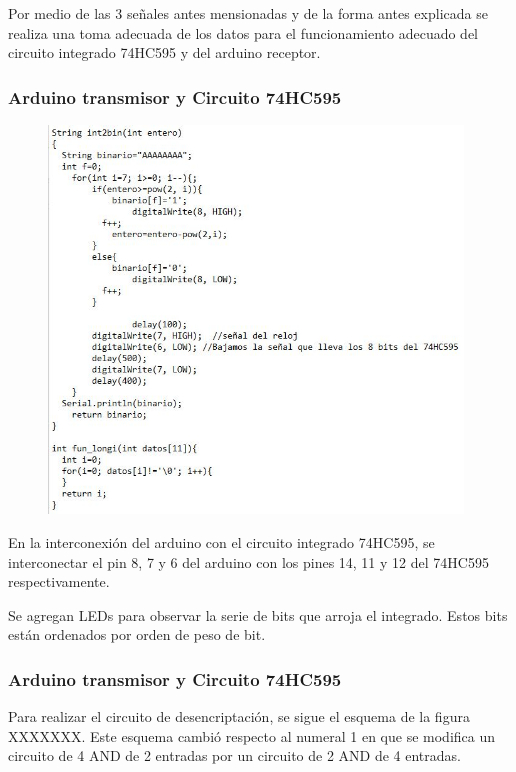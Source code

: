 \documentclass{article}
\begin{document}
Por medio de las 3 señales antes mensionadas y de la forma antes explicada se realiza una toma adecuada de los datos para el funcionamiento adecuado del circuito integrado 74HC595 y del arduino receptor.\\

\subsubsection{Arduino transmisor y Circuito 74HC595}

\begin{figure}[h]
\includegraphics[width=11cm]{Transmisor2.JPG}
\centering
\caption{}
\label{fig:conexion_arduino_con_74HC595.PNG}
\end{figure}

En la interconexión del arduino con el circuito integrado 74HC595, se interconectar el pin 8, 7 y 6 del arduino con los pines 14, 11 y 12 del 74HC595 respectivamente.

Se agregan LEDs para observar la serie de bits que arroja el integrado. Estos bits están ordenados por orden de peso de bit.

\subsubsection{Arduino transmisor y Circuito 74HC595}

Para realizar el circuito de desencriptación, se sigue el esquema de la figura XXXXXXX. Este esquema cambió respecto al numeral 1 en que se modifica un circuito de 4 AND de 2 entradas por un circuito de 2 AND de 4 entradas.
\end{document}
